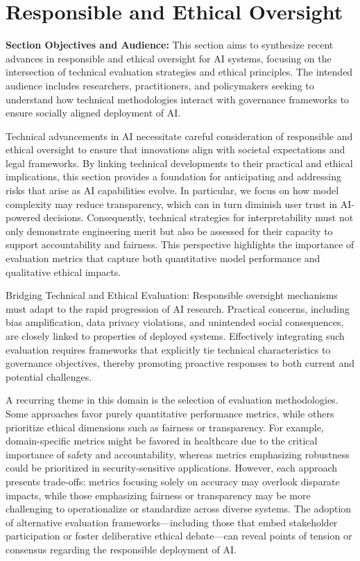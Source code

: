 \documentclass[sigconf]{acmart}
\begin{document}
\section{Responsible and Ethical Oversight}

\textbf{Section Objectives and Audience:}
This section aims to synthesize recent advances in responsible and ethical oversight for AI systems, focusing on the intersection of technical evaluation strategies and ethical principles. The intended audience includes researchers, practitioners, and policymakers seeking to understand how technical methodologies interact with governance frameworks to ensure socially aligned deployment of AI.

Technical advancements in AI necessitate careful consideration of responsible and ethical oversight to ensure that innovations align with societal expectations and legal frameworks. By linking technical developments to their practical and ethical implications, this section provides a foundation for anticipating and addressing risks that arise as AI capabilities evolve. In particular, we focus on how model complexity may reduce transparency, which can in turn diminish user trust in AI-powered decisions. Consequently, technical strategies for interpretability must not only demonstrate engineering merit but also be assessed for their capacity to support accountability and fairness. This perspective highlights the importance of evaluation metrics that capture both quantitative model performance and qualitative ethical impacts.

Bridging Technical and Ethical Evaluation:
Responsible oversight mechanisms must adapt to the rapid progression of AI research. Practical concerns, including bias amplification, data privacy violations, and unintended social consequences, are closely linked to properties of deployed systems. Effectively integrating such evaluation requires frameworks that explicitly tie technical characteristics to governance objectives, thereby promoting proactive responses to both current and potential challenges.

A recurring theme in this domain is the selection of evaluation methodologies. Some approaches favor purely quantitative performance metrics, while others prioritize ethical dimensions such as fairness or transparency. For example, domain-specific metrics might be favored in healthcare due to the critical importance of safety and accountability, whereas metrics emphasizing robustness could be prioritized in security-sensitive applications. However, each approach presents trade-offs: metrics focusing solely on accuracy may overlook disparate impacts, while those emphasizing fairness or transparency may be more challenging to operationalize or standardize across diverse systems. The adoption of alternative evaluation frameworks---including those that embed stakeholder participation or foster deliberative ethical debate---can reveal points of tension or consensus regarding the responsible deployment of AI.
\end{document}
